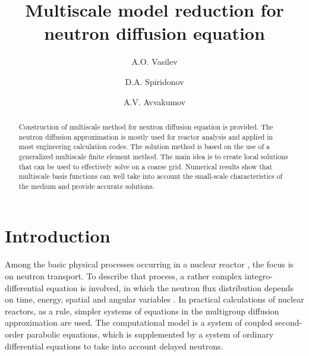 \documentclass[runningheads]{llncs}
\begin{document}
%
\title{Multiscale model reduction for neutron diffusion equation}
%
%
\author{A.O. Vasilev \and 
D.A. Spiridonov \and
A.V. Avvakumov }
%
%
%
\maketitle              %
%
\begin{abstract}
Construction of multiscale method for neutron diffusion equation is provided. 
The neutron diffusion approximation is mostly used for reactor analysis and applied in most engineering calculation codes. 
The solution method is based on the use of a generalized multiscale finite element method.
The main idea is to create local solutions that can be used to effectively solve on a coarse grid.
Numerical results show that multiscale basis functions can well take into account the small-scale characteristics of the medium and provide accurate solutions. 

\end{abstract}

\section{Introduction}
Among the basic physical processes occurring in a nuclear reactor \cite{Duderstadt1976}, the focus is on neutron transport. 
To describe that process, a rather complex integro-differential equation is involved, in which the neutron flux distribution depends on time, energy, spatial and angular variables \cite{Stacey2007}.
In practical calculations of nuclear reactors, as a rule, simpler systems of equations in the multigroup diffusion approximation are used. 
The computational model is a system of coupled second-order parabolic equations, which is supplemented by a system of ordinary differential equations to take into account delayed neutrons.
\end{document}
